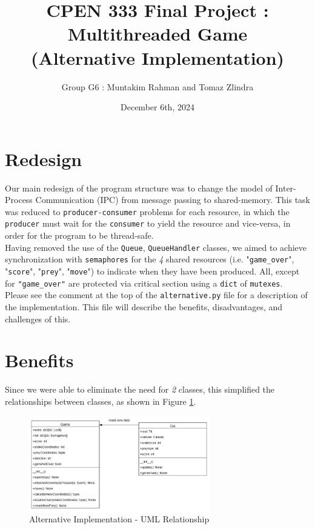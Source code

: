 \documentclass{article}
\title{CPEN 333 Final Project : Multithreaded Game \\ (Alternative Implementation)}
\author{Group G6 : Muntakim Rahman and Tomaz Zlindra}
\date{December 6th, 2024}
\begin{document}
\maketitle

\section{Redesign}
Our main redesign of the program structure was to change the model of Inter-Process Communication (IPC) from message passing to shared-memory.
This task was reduced to \texttt{producer-consumer} problems for each resource, in which the \texttt{producer} must wait for the \texttt{consumer} to yield the resource and vice-versa,
in order for the program to be thread-safe. \\

Having removed the use of the \texttt{Queue}, \texttt{QueueHandler} classes, we aimed to achieve synchronization with \texttt{semaphores} for
the \textit{4} shared resources (i.e. "\texttt{game\_over}", "\texttt{score}", "\texttt{prey}", "\texttt{move}") to indicate when they have been produced.
All, except for \texttt{"game\_over"} are protected via critical section using a \texttt{dict} of \texttt{mutexes}. \\

Please see the comment at the top of the \texttt{alternative.py} file for a description of the implementation. This file will describe the benefits, disadvantages, and challenges of this.

\section{Benefits}

Since we were able to eliminate the need for \textit{2} classes, this simplified the relationships between classes, as shown in Figure \ref{fig:Alternative_ClassDiagrams}. \\

\begin{figure}[H]
    \centering
    \includegraphics[width=0.7\textwidth]{../Alternative_ClassDiagrams.jpg}
    \caption{Alternative Implementation - UML Relationship}
    \label{fig:Alternative_ClassDiagrams}
\end{figure}
\end{document}
